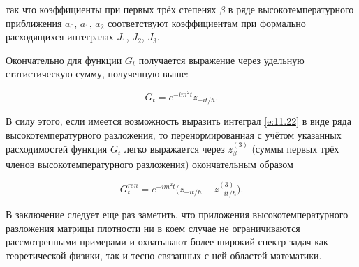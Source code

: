 так что коэффициенты при первых трёх степенях $\beta$ в ряде высокотемпературного приближения $a_0$, $a_1$, $a_2$ соответствуют коэффициентам при формально расходящихся интегралах $J_1$, $J_2$, $J_3$.



Окончательно для функции $G_t$ получается  выражение через удельную статистическую сумму, полученную выше:

\begin{equation}\label{e:11.24}

G_t=e^{-i m^2 t} z_{-i t /\hbar}.

\end{equation}

В силу этого, если имеется возможность выразить интеграл \eqref{e:11.22} в виде ряда высокотемпературного разложения, то перенормированная с учётом указанных расходимостей функция $G_t$ легко выражается через $z_{\beta}^{(3)}$ (суммы первых трёх членов высокотемпературного разложения) окончательным образом

\begin{equation}\label{e:11.25}

G^{ren}_t=e^{-i m^2 t}\bigl(z_{-i t /\hbar}-z_{-i t /\hbar}^{(3)}\bigr).

\end{equation}



В заключение следует еще раз заметить, что приложения высокотемпературного разложения матрицы плотности ни в коем случае не ограничиваются рассмотренными примерами и охватывают более широкий спектр задач как теоретической физики, так и тесно связанных с ней областей математики.




\pagebreak



